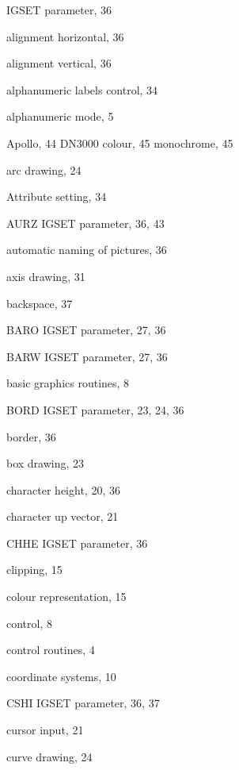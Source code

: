 \begin{theindex}
 
  \item *
    \subitem IGSET parameter, 36
 
  \indexspace
 
  \item alignment horizontal, 36
  \item alignment vertical, 36
  \item alphanumeric labels control, 34
  \item alphanumeric mode, 5
  \item Apollo, 44
    \subitem DN3000
      \subsubitem colour, 45
      \subsubitem monochrome, 45
  \item arc drawing, 24
  \item Attribute setting, 34
  \item AURZ
    \subitem IGSET parameter, 36, 43
  \item automatic naming of pictures, 36
  \item axis drawing, 31
 
  \indexspace
 
  \item backspace, 37
  \item BARO
    \subitem IGSET parameter, 27, 36
  \item BARW
    \subitem IGSET parameter, 27, 36
  \item basic graphics routines, 8
  \item BORD
    \subitem IGSET parameter, 23, 24, 36
  \item border, 36
  \item box drawing, 23
 
  \indexspace
 
  \item character height, 20, 36
  \item character up vector, 21
  \item CHHE
    \subitem IGSET parameter, 36
  \item clipping, 15
  \item colour representation, 15
  \item control, 8
  \item control routines, 4
  \item coordinate systems, 10
  \item CSHI
    \subitem IGSET parameter, 36, 37
  \item cursor input, 21
  \item curve drawing, 24
 

\end{theindex}

